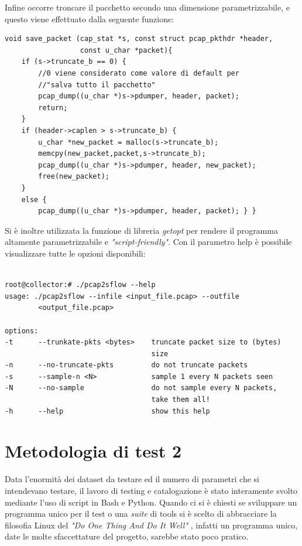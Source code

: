 \documentclass[12pt,a4paper,openright,twoside]{report}
\begin{document}
Infine occorre troncare il pacchetto secondo una dimensione parametrizzabile,
e questo viene effettuato dalla seguente funzione:

\begin{verbatim}
void save_packet (cap_stat *s, const struct pcap_pkthdr *header,
                  const u_char *packet){
    if (s->truncate_b == 0) {
        //0 viene considerato come valore di default per
        //"salva tutto il pacchetto"
        pcap_dump((u_char *)s->pdumper, header, packet);
        return;
    }
    if (header->caplen > s->truncate_b) {
        u_char *new_packet = malloc(s->truncate_b);
        memcpy(new_packet,packet,s->truncate_b);
        pcap_dump((u_char *)s->pdumper, header, new_packet);
        free(new_packet);
    }
    else {
        pcap_dump((u_char *)s->pdumper, header, packet); } }
\end{verbatim}

Si \`e inoltre utilizzata la funzione di libreria {\it getopt} per rendere
il programma altamente parametrizzabile e {\it "script-friendly"}.
Con il parametro {\verb --help } \`e possibile visualizzare tutte le opzioni disponibili:

\begin{verbatim}

root@collector:# ./pcap2sflow --help
usage: ./pcap2sflow --infile <input_file.pcap> --outfile
        <output_file.pcap>

options:
-t      --trunkate-pkts <bytes>    truncate packet size to (bytes)
                                   size
-n      --no-truncate-pkts         do not truncate packets
-s      --sample-n <N>             sample 1 every N packets seen
-N      --no-sample                do not sample every N packets,
                                   take them all!
-h      --help                     show this help

\end{verbatim}

\section{Metodologia di test 2}

Data l'enormit\`a dei dataset da testare ed il numero di parametri che si intendevano
testare, il lavoro di testing e catalogazione \`e stato interamente svolto mediante l'uso di
script in Bash e Python. Quando ci si \`e chiesti se sviluppare un programma unico
per il test o una {\it suite} di tools si \`e scelto di abbracciare la filosofia Linux
del {\it "Do One Thing And Do It Well"} \cite{EXP12}, infatti un programma unico, date le
molte sfaccettature del progetto, sarebbe stato poco pratico.
\end{document}
